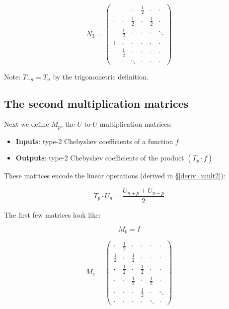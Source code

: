 \documentclass{article}
\begin{document}
\begin{equation*}
\renewcommand*{\arraystretch}{1.2}
N_3 =
\begin{pmatrix}
\cdot & \cdot & \cdot & \frac{1}{2} & \cdot & \cdot \\
\cdot & \cdot & \frac{1}{2} & \cdot & \frac{1}{2} & \cdot \\
\cdot & \frac{1}{2} & \cdot & \cdot & \cdot & \ddots \\
1 & \cdot & \cdot & \cdot & \cdot & \cdot \\
\cdot & \frac{1}{2} & \cdot & \cdot & \cdot & \cdot \\
\cdot & \cdot & \ddots & \cdot & \cdot & \cdot
\end{pmatrix}
\end{equation*}

Note: $T_{-n} = T_n$ by the trigonometric definition.

\subsection{The second multiplication matrices}

Next we define $M_p$, the $U$-to-$U$ multiplication matrices:

\begin{itemize}
    \item \textbf{Inputs}: type-2 Chebyshev coefficients of a function $f$
    \item \textbf{Outputs}: type-2 Chebyshev coefficients of the product $(T_p \cdot f)$
\end{itemize}

These matrices encode the linear operations (derived in \S \ref{deriv_mult2}):

\begin{equation}
T_p \cdot U_n = \frac{U_{n+p} + U_{n-p}}{2}
\end{equation}

The first few matrices look like:

\begin{equation*}
M_0 = I
\end{equation*}

\begin{equation*}
\renewcommand*{\arraystretch}{1.2}
M_1 =
\begin{pmatrix}
\cdot & \frac{1}{2} & \cdot & \cdot & \cdot & \cdot \\
\frac{1}{2} & \cdot & \frac{1}{2} & \cdot & \cdot & \cdot \\
\cdot & \frac{1}{2} & \cdot & \frac{1}{2} & \cdot & \cdot \\
\cdot & \cdot & \frac{1}{2} & \cdot & \frac{1}{2} & \cdot \\
\cdot & \cdot & \cdot & \frac{1}{2} & \cdot & \ddots \\
\cdot & \cdot & \cdot & \cdot & \ddots & \cdot
\end{pmatrix}
\end{equation*}
\end{document}
